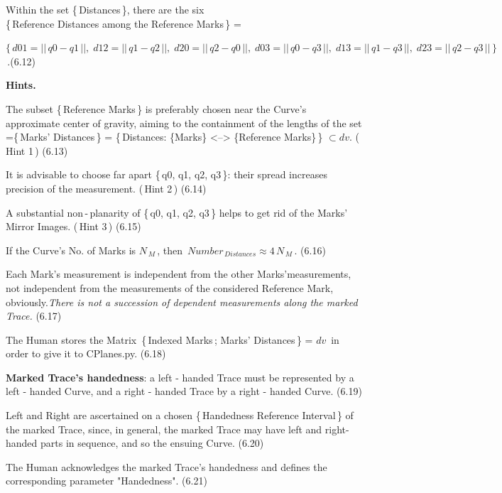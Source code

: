 \documentclass[12pt]{article} %
\begin{document}
{\noindent Within the set \{\,Distances\,\}, there are the six\\ \{\,Reference Distances among the Reference Marks\,\} =

\noindent $\big\{\,d01 = ||\,q0 - q1\,||,\; d12 = ||\,q1 - q2\,||,\; d20 = ||\,q2 - q0\,||,\; d03 = ||\,q0 - q3\,||,\; d13 = ||\,q1 - q3\,||,\; d23 = ||\,q2 - q3\,||\,\big\}$\,.\qquad \qquad (6.12)

\noindent \textbf{Hints.}

\noindent The subset \{\,Reference Marks\,\} is preferably  chosen near the Curve's approximate center of gravity, aiming to the containment of the lengths of the set\\ =\{\,Marks' Distances\,\} = \big\{\,Distances: \{Marks\} <--> \{Reference Marks\}\,\big\} $\subset dv$. \qquad (\,Hint 1\,) \qquad (6.13)

\noindent It is advisable to choose far apart \{\,q0, q1, q2, q3\,\}: their spread increases precision of the measurement. \qquad \qquad \qquad \qquad (\,Hint 2\,) \qquad (6.14)

\noindent A substantial non\,-\,planarity of \{\,q0, q1, q2, q3\,\} helps to get rid of the Marks' Mirror Images. \qquad \qquad \qquad \qquad (\,Hint 3\,) \quad (6.15)

\noindent If the Curve's No. of Marks is ${N}_{\,M}$\,, then\, $Number_{\,Distances} \approx 4\,N_{\,M}$\,.\; (6.16)   

\noindent Each Mark's measurement is independent from the other Marks'measurements, not independent from the measurements of the considered Reference Mark, obviously.\textsl{There is not a succession of dependent measurements along the marked Trace.} \qquad (6.17)  

\noindent The Human stores the Matrix\, \{\,Indexed Marks\,; Marks' Distances\,\} = $dv$ \,in order to give it to CPlanes.py. \qquad (6.18)

\noindent \textbf{Marked Trace's handedness}: a left - handed Trace must be represented by a left - handed Curve, and a right - handed Trace by a right - handed Curve. \qquad (6.19)

\noindent Left and Right are ascertained on a chosen \{\,Handedness Reference Interval\,\} of the marked Trace, since, in general, the marked Trace may have left and right-handed parts in sequence, and so the ensuing Curve.  \qquad \qquad (6.20)

\noindent The Human acknowledges the marked Trace's handedness and defines the corresponding parameter "Handedness". \quad (6.21)

}
\end{document}
